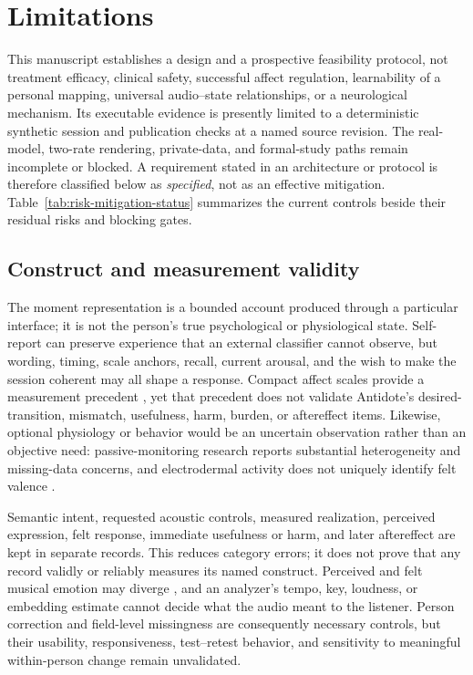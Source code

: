 \section{Limitations}
\label{sec:limitations}

This manuscript establishes a design and a prospective feasibility protocol,
not treatment efficacy, clinical safety, successful affect regulation,
learnability of a personal mapping, universal audio--state relationships, or a
neurological mechanism. Its executable evidence is presently limited to a
deterministic synthetic session and publication checks at a named source
revision. The real-model, two-rate rendering, private-data, and formal-study
paths remain incomplete or blocked. A requirement stated in an architecture or
protocol is therefore classified below as \emph{specified}, not as an effective
mitigation. Table~\ref{tab:risk-mitigation-status} summarizes the current
controls beside their residual risks and blocking gates.

\subsection{Construct and measurement validity}
\label{sec:limitations-construct-validity}

The moment representation is a bounded account produced through a particular
interface; it is not the person's true psychological or physiological state.
Self-report can preserve experience that an external classifier cannot observe,
but wording, timing, scale anchors, recall, current arousal, and the wish to make
the session coherent may all shape a response. Compact affect scales provide a
measurement precedent \citep{betella2016slider}, yet that precedent does not
validate Antidote's desired-transition, mismatch, usefulness, harm, burden, or
aftereffect items. Likewise, optional physiology or behavior would be an
uncertain observation rather than an objective need: passive-monitoring
research reports substantial heterogeneity and missing-data concerns, and
electrodermal activity does not uniquely identify felt valence
\citep{deangel2022passive,damelio2025eda}.

Semantic intent, requested acoustic controls, measured realization, perceived
expression, felt response, immediate usefulness or harm, and later aftereffect
are kept in separate records. This reduces category errors; it does not prove
that any record validly or reliably measures its named construct. Perceived and
felt musical emotion may diverge \citep{zentner2008emotions}, and an analyzer's
tempo, key, loudness, or embedding estimate cannot decide what the audio meant
to the listener. Person correction and field-level missingness are consequently
necessary controls, but their usability, responsiveness, test--retest behavior,
and sensitivity to meaningful within-person change remain unvalidated.

